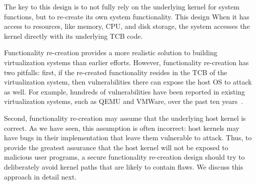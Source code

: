 
The key to this design is to not fully rely on the underlying
kernel for system functions, but to re-create its own system functionality.
This design  %
When it has access to resources, like memory, CPU, and disk storage, the system
accesses the kernel directly with its underlying TCB code.

Functionality re-creation provides a more realistic solution to building
virtualization systems than earlier efforts.
However, functionality re-creation has two pitfalls:
first, if the re-created functionality resides in the TCB of the virtualization system, then vulnerabilities there can expose the host OS to attack as well.
For example, hundreds of vulnerabilities have been
reported in existing virtualization systems, such as QEMU and VMWare, over the
past ten years~\cite{NVD}.

Second, functionality re-creation may assume that the underlying host kernel is correct.
As we have seen, this assumption is often incorrect: host kernels may have bugs in their implementation that leave them vulnerable to attack.
Thus, to provide the greatest assurance that the host kernel will not be exposed to malicious user programs,
a secure functionality re-creation design should try to deliberately avoid kernel paths that are likely to contain flaws.
We discuss this approach in detail next.

